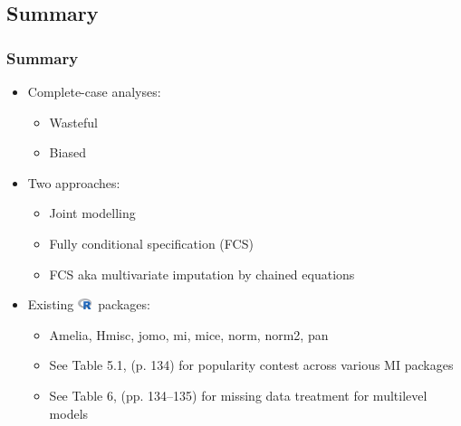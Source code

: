 \documentclass[UKenglish
  pdftex                    %
  dvipsnames                %
]{beamer}
\newcommand{\xmark}{\textcolor{red}{\ding{55}}}
\newcommand{\cR}{\includegraphics[width=1.1em]{Figures/R.png}\ }
\newcommand{\pk}[1]{\textcolor{Rblue}{\textsf{#1}}}
\begin{document}
\subsection{Summary}
\begin{frame}\frametitle{Summary}

\begin{itemize}

  \item Complete-case analyses:
  \begin{itemize}
    \item[\xmark] Wasteful
    \item[\xmark] Biased
  \end{itemize}

  \item Two approaches:
  \begin{itemize}
    \item[\ding{192}] Joint modelling \parencite[JM,][]{schafer:1997}
    \item[\ding{193}] Fully conditional specification (FCS)
    \item[\ding{43}] FCS aka multivariate imputation by chained equations \parencite[MICE,][]{vanbuuren:2011}
  \end{itemize}

  \item Existing \cR packages:
  \begin{itemize}
    \item[\ding{228}] \pk{Amelia}, \pk{Hmisc}, \pk{jomo}, \pk{mi}, \pk{mice}, \pk{norm}, \pk{norm2}, \pk{pan}
    \item[\ding{45}] See Table 5.1, \textcite{kleinke:2020} (p. 134) for popularity contest across various MI packages
    \item[\ding{45}] See Table 6, \textcite{grund:2018} (pp. 134--135) for missing data treatment for multilevel models
  \end{itemize}

\end{itemize}

\end{frame}
\end{document}

